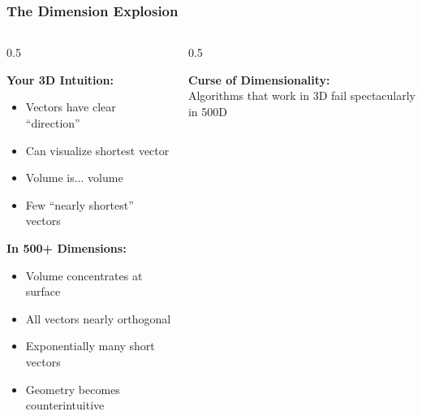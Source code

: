\documentclass[aspectratio=169,10pt]{beamer}
\newcommand{\teaching}[1]{}
\newcommand{\slideheader}[1]{\frametitle{#1}}
\theoremstyle{plain}
\begin{document}
\begin{frame}
  \slideheader{The Dimension Explosion}
  
  \begin{columns}[T]
    \begin{column}{0.5\textwidth}

    \textbf{Your 3D Intuition:}
    \begin{itemize}
      \item Vectors have clear ``direction''
      \item Can visualize shortest vector
      \item Volume is... volume
      \item Few ``nearly shortest'' vectors
    \end{itemize}
    
    \vspace{0.5cm}
    
    \textbf{In 500+ Dimensions:}
    \begin{itemize}
      \item Volume concentrates at surface
      \item All vectors nearly orthogonal
      \item Exponentially many short vectors
      \item Geometry becomes counterintuitive
    \end{itemize}
  
    \end{column}
    \begin{column}{0.5\textwidth}

    
    \vspace{0.5cm}
    
    \begin{redBox}
      \textbf{Curse of Dimensionality:}\\
      Algorithms that work in 3D fail spectacularly in 500D
    \end{redBox}
  
    \end{column}
  \end{columns}
  
  \teaching{Explain why high dimensions matter}
\end{frame}
\end{document}
